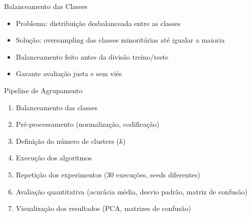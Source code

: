 \documentclass[aspectratio=169]{beamer}
\begin{document}
\begin{frame}{Balanceamento das Classes}
\begin{itemize}
    \item Problema: distribuição desbalanceada entre as classes
    \item Solução: oversampling das classes minoritárias até igualar a maioria
    \item Balanceamento feito antes da divisão treino/teste
    \item Garante avaliação justa e sem viés
\end{itemize}
\end{frame}

\begin{frame}{Pipeline de Agrupamento}
\begin{enumerate}
    \item Balanceamento das classes
    \item Pré-processamento (normalização, codificação)
    \item Definição do número de clusters ($k$)
    \item Execução dos algoritmos
    \item Repetição dos experimentos (30 execuções, seeds diferentes)
    \item Avaliação quantitativa (acurácia média, desvio padrão, matriz de confusão)
    \item Visualização dos resultados (PCA, matrizes de confusão)
\end{enumerate}
\end{frame}
\end{document}
